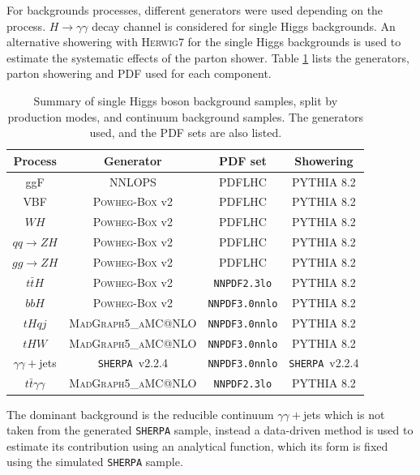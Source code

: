 For backgrounds processes, different generators were used depending on the process. $H\to\gamma\gamma$ decay channel is considered for single Higgs backgrounds. An alternative showering with \textsc{Herwig}7 for the single Higgs backgrounds is used to estimate the systematic effects of the parton shower. Table \ref{tab:HHyybb:Data&MC:Samples} lists the generators, parton showering and PDF used for each component. 
\begin{table}[htbp]
  \centering
    \begin{tabular}{ cccc }
    \hline\hline
    Process & Generator & PDF set  & Showering    \\
       \hline\hline
        ggF  & NNLOPS & PDFLHC &  \textsc{PYTHIA} 8.2  \\
        VBF & \textsc{Powheg-Box} v2 & PDFLHC  &  \textsc{PYTHIA} 8.2        \\
        $WH$ & \textsc{Powheg-Box} v2 & PDFLHC  &  \textsc{PYTHIA} 8.2 \\
        $qq\to ZH$ & \textsc{Powheg-Box} v2 &  PDFLHC  &  \textsc{PYTHIA} 8.2 \\
        $gg\to ZH$ &  \textsc{Powheg-Box} v2 & PDFLHC  &  \textsc{PYTHIA} 8.2  \\
        $t\bar{t}H$ & \textsc{Powheg-Box} v2 & \texttt{NNPDF2.3lo} & \textsc{PYTHIA} 8.2  \\
        $bbH$ &  \textsc{Powheg-Box} v2 & \texttt{NNPDF3.0nnlo}  &  \textsc{PYTHIA} 8.2     \\
        $tHqj$ & \textsc{MadGraph5\_aMC@NLO} &  \texttt{NNPDF3.0nnlo}  & \textsc{PYTHIA} 8.2   \\
        $tHW$  & \textsc{MadGraph5\_aMC@NLO} &  \texttt{NNPDF3.0nnlo}  & \textsc{PYTHIA} 8.2   \\
         $\gamma\gamma+$jets &   \texttt{SHERPA}~v2.2.4 & \texttt{NNPDF3.0nnlo}  &  \texttt{SHERPA}~v2.2.4  \\
         $t\bar{t} \gamma \gamma$ & \textsc{MadGraph5\_aMC@NLO}  &  \texttt{NNPDF2.3lo} & \textsc{PYTHIA} 8.2 \\
        \hline\hline
    \end{tabular}
    \caption{Summary of single Higgs boson background samples, split by production modes, and continuum background samples. The generators used, and the PDF sets are also listed. }
  \label{tab:HHyybb:Data&MC:Samples}
\end{table}

The dominant background is the reducible continuum $\gamma\gamma+$jets which is not taken from the generated \texttt{SHERPA} sample, instead a data-driven method is used to estimate its contribution using an analytical function, which its form is fixed using the simulated \texttt{SHERPA} sample.

